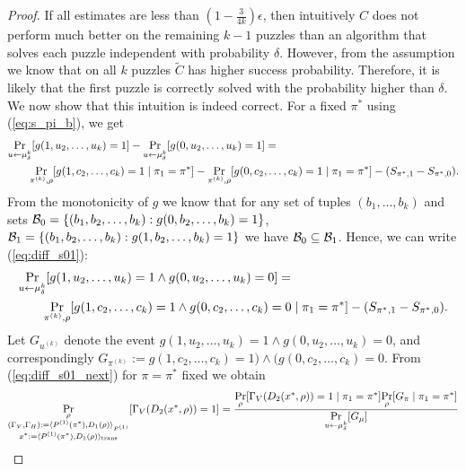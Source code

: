 \begin{proof}
If all estimates are less than $(1-\frac{3}{4k})\epsilon$, then intuitively $C$
does not perform much better on the remaining $k-1$ puzzles than an algorithm that solves each puzzle independent with probability $\delta$.
However, from the assumption we know that on all $k$ puzzles $\widetilde{C}$ has higher success probability.
Therefore, it is likely that the first puzzle is correctly solved with the probability higher than $\delta$.
%
We now show that this intuition is indeed correct. For a fixed $\pi^*$ using (\ref{eq:s_pi_b}), we get
\begin{align}
\label{eq:diff_s01}
  &\underset{u \leftarrow \mu_{\delta}^k}{\Pr}[g(1, u_2, \dots, u_k)=1] - \underset{u \leftarrow \mu_{\delta}^k}{\Pr}[g(0, u_2, \dots, u_k)=1] = \notag\\
&\mbox\qquad  \underset{\pi^{(k)}, \rho}{\Pr}[g(1, c_2, \dots, c_k) =1 \mid \pi_1 = \pi^*] - \underset{\pi^{(k)}, \rho}{\Pr}[g(0, c_2, \dots, c_k) = 1 \mid \pi_1 = \pi^*] - (S_{\pi^*,1} - S_{\pi^*,0}).
\end{align}
From the monotonicity of $g$ we know that for any set of tuples $(b_1, \dots, b_k)$
and sets $\mathcal{B}_0 = \{ (b_1, b_2, \dots, b_k): g(0, b_2, \dots, b_k) = 1\}$, $ \mathcal{B}_1 = \{(b_1, b_2, \dots, b_k) : g(1, b_2, \dots, b_k) = 1 \}$
we have $\mathcal{B}_0 \subseteq \mathcal{B}_1$. Hence, we can write (\ref{eq:diff_s01}):
\begin{align}
  \label{eq:diff_s01_next}
  &\underset{u \leftarrow \mu_{\delta}^k}{\Pr}[g(1, u_2, \dots, u_k) = 1 \land g(0, u_2, \dots, u_k) = 0] = \notag\\
&\mbox\qquad  \underset{\pi^{(k)}, \rho}{\Pr}[g(1, c_2, \dots, c_k) = 1 \land g(0, c_2, \dots, c_k) = 0 \mid \pi_1 = \pi^*] - (S_{\pi^*,1} - S_{\pi^*,0}).
\end{align}
Let $G_{u^{(k)}}$ denote the event $g(1, u_2, \dots, u_k) = 1 \land g(0, u_2, \dots, u_k) = 0$, and correspondingly
$G_{\pi^{(k)}} := g(1, c_2, \dots, c_k) = 1) \land (g(0, c_2, \dots, c_k) = 0$.
From (\ref{eq:diff_s01_next}) for $\pi = \pi^*$ fixed we obtain
\begin{align}
\label{eq:pr_d_succ_0}
  \underset{\substack{\rho \\ \prGx}}{\Pr}[\Gamma_V(D_2(x^*, \rho)) = 1] &=
  \frac{\underset{\rho}{\Pr}[\Gamma_V(D_2(x^*, \rho)) = 1 \mid \pi_1 = \pi^*] \underset{\rho}{\Pr}[G_{\pi} \mid \pi_1 = \pi^*]} {\underset{u \leftarrow \mu_{\delta}^{k}}{\Pr}[G_{\mu}]} \notag\\

\end{align}
\end{proof}
